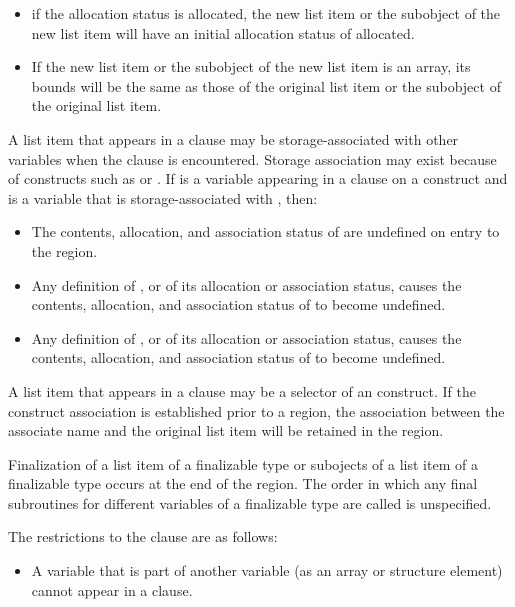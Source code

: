 {{{{\begin{itemize}
\item if the allocation status is allocated, the new list item or the subobject of
the new list item will have an initial allocation status of allocated.

\item If the new list item or the subobject of the new list item is an array, its bounds will be 
the same as those of the original list item or the subobject of the original list item.
\end{itemize}

A list item that appears in a  clause may be storage-associated with other 
variables when the  clause is encountered. Storage association may exist 
because of constructs such as  or . If  is a variable appearing 
in a  clause on a construct and  is a variable that is storage-associated with , then:

\begin{itemize}
\item The contents, allocation, and association status of  are undefined on entry to the region.

\item Any definition of , or of its allocation or association status, causes the contents, 
allocation, and association status of  to become undefined. 

\item Any definition of , or of its allocation or association status, causes the contents, 
allocation, and association status of  to become undefined. 
\end{itemize}

A list item that appears in a  clause may be a selector of an  
construct. If the construct association is established prior to a  region, the 
association between the associate name and the original list item will be retained in the 
region.

Finalization of a list item of a finalizable type or subojects of a
list item of a finalizable type occurs at the end of the region. The
order in which any final subroutines for different variables of a
finalizable type are called is unspecified.
\fortranspecificend

\restrictions
The restrictions to the  clause are as follows:

\begin{itemize}
\cspecificstart
\item A variable that is part of another variable (as an array or structure element) cannot 
appear in a  clause.
\cspecificend


\end{itemize}}}}}
